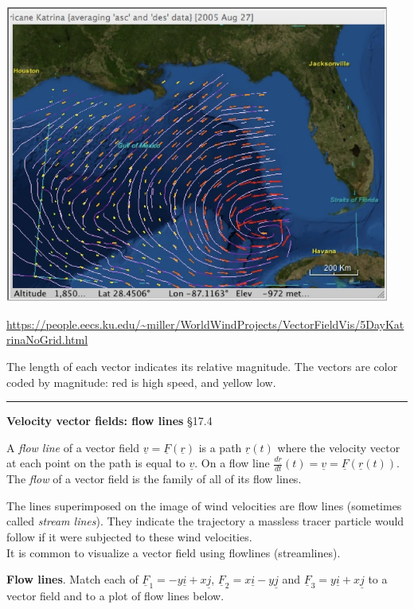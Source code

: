 \documentclass[12pt,letterpaper,noanswers]{exam}
\newcommand{\mb}[1]{\underline{#1}}
\begin{document}
\includegraphics[width=5in]{img/N24_p2.png}

\url{https://people.eecs.ku.edu/~miller/WorldWindProjects/VectorFieldVis/5DayKatrinaNoGrid.html}



The length of each vector indicates its relative magnitude.  The vectors are color coded by magnitude: red is high speed, and yellow low.  


\vspace{0.2cm}
\hrule
\vspace{0.2cm}

\noindent\textbf{Velocity vector fields: flow lines} \S 17.4
\begin{tcolorbox}
  A \emph{flow line} of a vector field $\mb v = \mb F(\mb r)$ is a path $\mb r(t)$ where the velocity vector at each point on the path is equal to $\mb v$.  On a flow line $\frac{d\mb r}{dt}(t) = \mb v = \mb F(\mb r(t))$. \\

The \emph{flow} of a vector field is the family of all of its flow lines.

\tcblower

The lines superimposed on the image of wind velocities are flow lines (sometimes called \emph{stream lines}).  They indicate the trajectory a massless tracer particle would follow if it were subjected to these wind velocities. \\

It is common to visualize a vector field using flowlines (streamlines).
\end{tcolorbox}


\noindent\textbf{Flow lines}.  Match each of $\mb F_1 = -y\mb i + x\mb j$, $\mb F_2 = x\mb i - y\mb j$ and $\mb F_3 = y\mb i + x\mb j$ to a vector field and to a plot of flow lines below.
\end{document}
